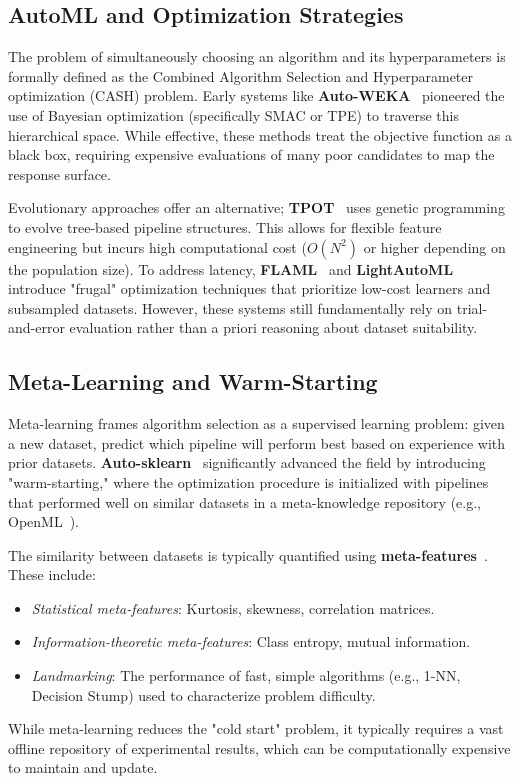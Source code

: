 \documentclass[conference]{IEEEtran}
\begin{document}
   \subsection{AutoML and Optimization Strategies}

   The problem of simultaneously choosing an algorithm and its hyperparameters is formally defined as the Combined Algorithm Selection and Hyperparameter optimization (CASH) problem. Early systems like \textbf{Auto-WEKA}~\cite{thornton2013auto} pioneered the use of Bayesian optimization (specifically SMAC or TPE) to traverse this hierarchical space. While effective, these methods treat the objective function as a black box, requiring expensive evaluations of many poor candidates to map the response surface.

   Evolutionary approaches offer an alternative; \textbf{TPOT}~\cite{olson2016tpot} uses genetic programming to evolve tree-based pipeline structures. This allows for flexible feature engineering but incurs high computational cost ($O(N^2)$ or higher depending on the population size). To address latency, \textbf{FLAML}~\cite{wang2021flaml} and \textbf{LightAutoML} introduce "frugal" optimization techniques that prioritize low-cost learners and subsampled datasets. However, these systems still fundamentally rely on trial-and-error evaluation rather than a priori reasoning about dataset suitability.

   \subsection{Meta-Learning and Warm-Starting}

   Meta-learning frames algorithm selection as a supervised learning problem: given a new dataset, predict which pipeline will perform best based on experience with prior datasets. \textbf{Auto-sklearn}~\cite{feurer2015efficient} significantly advanced the field by introducing "warm-starting," where the optimization procedure is initialized with pipelines that performed well on similar datasets in a meta-knowledge repository (e.g., OpenML~\cite{vanschoren2013openml}).

   The similarity between datasets is typically quantified using \textbf{meta-features}~\cite{brazil2010metalearning,leite2012survey}. These include:
   \begin{itemize}
       \item \emph{Statistical meta-features}: Kurtosis, skewness, correlation matrices.
       \item \emph{Information-theoretic meta-features}: Class entropy, mutual information.
       \item \emph{Landmarking}: The performance of fast, simple algorithms (e.g., 1-NN, Decision Stump) used to characterize problem difficulty.
   \end{itemize}
   While meta-learning reduces the "cold start" problem, it typically requires a vast offline repository of experimental results, which can be computationally expensive to maintain and update.
\end{document}
